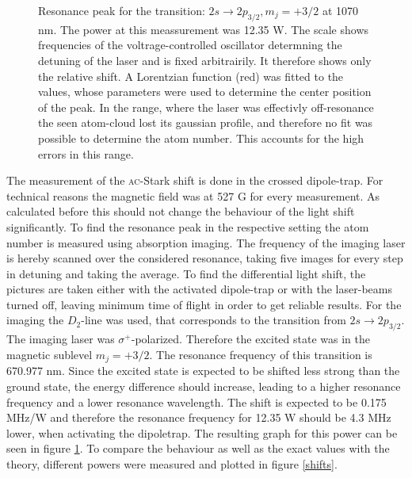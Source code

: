 \begin{figure}[h]
\caption{Resonance peak for the transition: $2s\rightarrow2p_{3/2}, m_j=+3/2$ at 1070 nm. The power at this meassurement was 12.35 W. The scale shows frequencies of the voltrage-controlled oscillator determning the detuning of the laser and is fixed arbitrairily. It therefore shows only the relative shift. A Lorentzian function (red) was fitted to the values, whose parameters were used to determine the center position of the peak. In the range, where the laser was effectivly off-resonance the seen atom-cloud lost its gaussian profile, and therefore no fit was possible to determine the atom number. This accounts for the high errors in this range.}
\label{resonance}
\end{figure}

The measurement of the \textsc{ac}-Stark shift is done in the crossed dipole-trap. For technical reasons the magnetic field was at 527 G for every measurement. As calculated before this should not change the behaviour of the light shift significantly. To find the resonance peak in the respective setting the atom number is measured using absorption imaging. The frequency of the imaging laser is hereby scanned over the considered resonance, taking five images for every step in detuning and taking the average. To find the differential light shift, the pictures are taken either with the activated dipole-trap or with the laser-beams turned off, leaving minimum time of flight in order to get reliable results. For the imaging the $D_2$-line was used, that corresponds to the transition from  $2s\rightarrow2p_{3/2}$. The imaging laser was $\sigma^+$-polarized. Therefore the excited state was in the magnetic sublevel $m_j=+3/2$. The resonance frequency of this transition is 670.977 nm. Since the excited state is expected to be shifted less strong than the ground state, the energy difference should increase, leading to a higher resonance frequency and a lower resonance wavelength. The shift is expected to be 0.175 MHz/W and therefore the resonance frequency for 12.35 W should be 4.3 MHz lower, when activating the dipoletrap. The resulting graph for this power can be seen in figure \ref{resonance}. To compare the behaviour as well as the exact values with the theory, different powers were measured and plotted in figure \ref{shifts}. 

